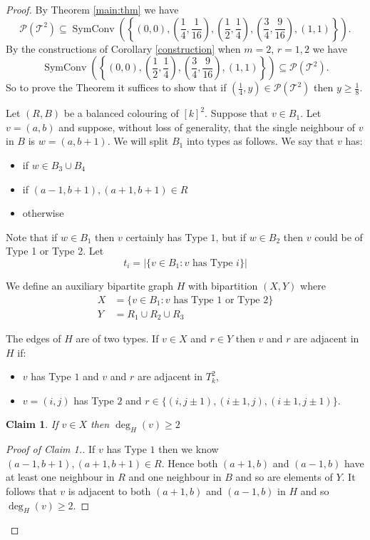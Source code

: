 \documentclass[12pt,a4paper]{article}
\newcommand{\T}{\mathcal T}
\newcommand{\Pcal}{\mathcal P}
\DeclareMathOperator{\sch}{SymConv}
\newtheorem{claim}{Claim}
\begin{document}
\begin{proof}
By Theorem \ref{main:thm} we have
\[
\Pcal(\T^2)\subseteq\sch\left(\left\{\left(0,0\right),\left(\frac{1}{4},\frac{1}{16}\right),\left(\frac{1}{2},\frac{1}{4}\right),\left(\frac{3}{4},\frac{9}{16}\right),\left(1,1\right)\right\}\right).
\]
By the constructions of Corollary \ref{construction} when $m=2$, $r=1,2$ we have
\[
\sch\left(\left\{\left(0,0\right),\left(\frac{1}{2},\frac{1}{4}\right),\left(\frac{3}{4},\frac{9}{16}\right),\left(1,1\right)\right\}\right)\subseteq\Pcal(\T^2).
\]
So to prove the Theorem it suffices to show that if $(\frac{1}{4},y)\in\Pcal(\T^2)$ then $y\geq\frac{1}{8}$. 

Let $(R,B)$ be a balanced colouring of $[k]^2$. Suppose that $v\in B_1$. Let $v=(a,b)$ and suppose, without loss of generality, that the single neighbour of $v$ in $B$ is $w=(a,b+1)$. We will split $B_1$ into types as follows. We say that $v$ has:

\begin{itemize}
\item[Type 3:] if $w\in B_3\cup B_4$
\item[Type 1:] if $(a-1,b+1),(a+1,b+1)\in R$  
\item[Type 2:] otherwise
\end{itemize}
Note that if $w\in B_1$ then $v$ certainly has Type $1$, but if $w\in B_2$ then $v$ could be of Type 1 or Type 2. Let 
\[
t_i=|\{v\in B_1 : \text{$v$ has Type $i$}\}|
\]

We define an auxiliary bipartite graph $H$ with bipartition $(X,Y)$ where
\begin{align*}
X&=\{ v\in B_1 : \text{$v$ has Type $1$ or Type $2$}\}\\
Y&=R_1\cup R_2\cup R_3
\end{align*}

The edges of $H$ are of two types. If $v\in X$ and $r\in Y$ then $v$ and $r$ are adjacent in $H$ if:
\begin{itemize}
\item $v$ has Type $1$ and $v$ and $r$ are adjacent in $T_k^2$,
\item $v=(i,j)$ has Type $2$ and $r\in\{(i,j\pm1), (i\pm1,j),(i\pm1,j\pm1)\}$.
\end{itemize}

\begin{claim}
If $v\in X$ then $\deg_H(v)\geq 2$
\end{claim}

\begin{proof}[Proof of Claim 1.]
If $v$ has Type $1$ then we know $(a-1,b+1),(a+1,b+1)\in R$. Hence both $(a+1,b)$ and $(a-1,b)$ have at least one neighbour in $R$ and one neighbour in $B$ and so are elements of $Y$. It follows that $v$ is adjacent to both $(a+1,b)$ and $(a-1,b)$ in $H$ and so $\deg_H(v)\geq 2$.


\end{proof}
\end{proof}
\end{document}
